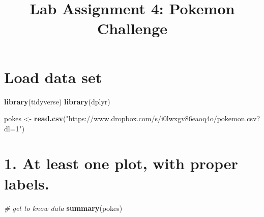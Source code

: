 \documentclass[]{article}
\title{Lab Assignment 4: Pokemon Challenge}
\author{}
\date{}
\newenvironment{Shaded}{\begin{snugshade}}{\end{snugshade}}
\newcommand{\KeywordTok}[1]{\textcolor[rgb]{0.13,0.29,0.53}{\textbf{#1}}}
\newcommand{\StringTok}[1]{\textcolor[rgb]{0.31,0.60,0.02}{#1}}
\newcommand{\CommentTok}[1]{\textcolor[rgb]{0.56,0.35,0.01}{\textit{#1}}}
\newcommand{\NormalTok}[1]{#1}
\begin{document}
\maketitle

\section{Load data set}\label{load-data-set}

\begin{Shaded}
\begin{Highlighting}[]
\KeywordTok{library}\NormalTok{(tidyverse)}
\KeywordTok{library}\NormalTok{(dplyr)}

\NormalTok{pokes <-}\StringTok{ }\KeywordTok{read.csv}\NormalTok{(}\StringTok{"https://www.dropbox.com/s/i0lwxgv86eaoq4o/pokemon.csv?dl=1"}\NormalTok{)}
\end{Highlighting}
\end{Shaded}

\section{1. At least one plot, with proper
labels.}\label{at-least-one-plot-with-proper-labels.}

\begin{Shaded}
\begin{Highlighting}[]
\CommentTok{# get to know data}
\KeywordTok{summary}\NormalTok{(pokes)}
\end{Highlighting}
\end{Shaded}
\end{document}
